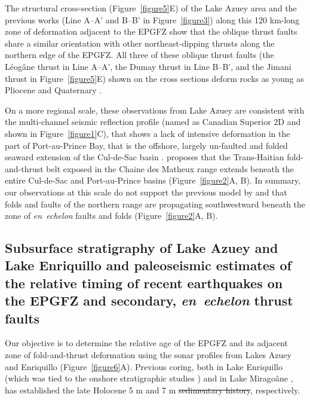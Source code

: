 \documentclass[linenumbers,draft]{agujournal}
\providecommand{\DIFaddtex}[1]{{\protect\color{blue}\uwave{#1}}} %
\providecommand{\DIFdeltex}[1]{{\protect\color{red}\sout{#1}}}                      %
\providecommand{\DIFaddbegin}{} %
\providecommand{\DIFaddend}{} %
\providecommand{\DIFdelbegin}{} %
\providecommand{\DIFdelend}{} %
\providecommand{\DIFadd}[1]{\texorpdfstring{\DIFaddtex{#1}}{#1}} %
\providecommand{\DIFdel}[1]{\texorpdfstring{\DIFdeltex{#1}}{}} %
\begin{document}
The structural cross-section (Figure~\ref{figure5}E) of the Lake Azuey area and the previous works \citep{massoni1955haiti,bourgueil1988synthese,cox2011shear,douilly2015three} (Line A--A' and B--B' in Figure~\ref{figure3}) along this 120 km-long zone of deformation adjacent to the EPGFZ show that the oblique thrust faults share a similar orientation with other northeast-dipping thrusts along the northern edge of the EPGFZ. All three of these oblique thrust faults (the L\'eog\^ane thrust in Line A--A', the Dumay thrust in Line B--B', and the Jimani thrust in Figure~\ref{figure5}E) shown on the cross sections deform rocks as young as Pliocene and Quaternary \citep{saint2015seismotectonics}. 

On a more regional scale, these observations from Lake Azuey are consistent with the multi-channel seismic reflection profile (named as Canadian Superior 2D and shown in Figure~\ref{figure1}C), that shows a lack of intensive deformation in the part of Port-au-Prince Bay, that is the offshore, largely un-faulted and folded seaward extension of the Cul-de-Sac basin \citep{mchugh2011offshore}. \citet{pubellier2000plate} proposes that the Trans-Haitian fold-and-thrust belt exposed in the Chaine des Matheux range extends beneath the entire Cul-de-Sac and Port-au-Prince basins (Figure~\ref{figure2}A, B). In summary, our observations at this scale do not support the previous model by \citet{pubellier2000plate} and \citet{calais2010transpressional} that folds and faults of the northern range are propagating southwestward beneath the zone of \textit{en~echelon} faults and folds (Figure~\ref{figure2}A, B).

\subsection{Subsurface stratigraphy of Lake Azuey and Lake Enriquillo and paleoseismic estimates of the relative timing of recent earthquakes on the EPGFZ and secondary, \textit{en~echelon} thrust faults}
Our objective is to determine the relative age of the EPGFZ and its adjacent zone of fold-and-thrust deformation using the sonar profiles from Lakes Azuey and Enriquillo (Figure~\ref{figure6}A). Previous coring, both in Lake Enriquillo \citep{rios2013holocene} (which was tied to the onshore stratigraphic studies \citep{taylor1985stratigraphy,rios2013holocene}) and in Lake Mirago\^ane \citep{higuera199910}, has established the late Holocene \DIFaddbegin \DIFadd{history in the upper }\DIFaddend 5 m and 7 m \DIFdelbegin \DIFdel{sedimentary history}\DIFdelend \DIFaddbegin \DIFadd{sediment}\DIFaddend , respectively.
\end{document}
